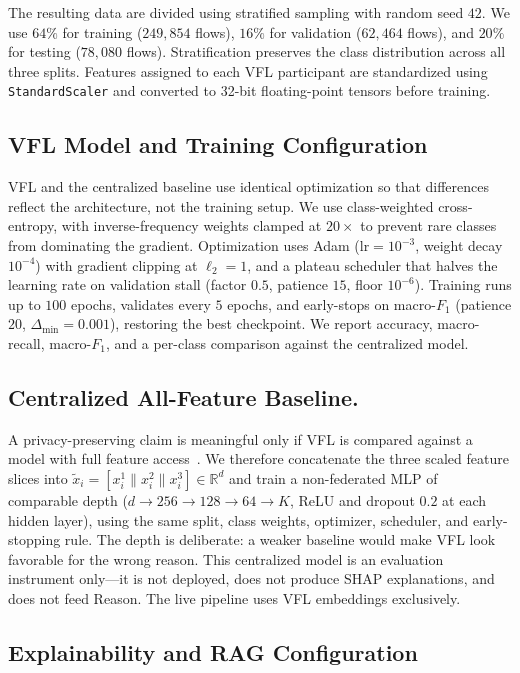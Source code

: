 \documentclass[10pt, conference]{IEEEtran}
\begin{document}
The resulting data are divided using stratified sampling with random seed $42$. We use $64\%$ for training ($249{,}854$ flows), $16\%$ for validation ($62{,}464$ flows), and $20\%$ for testing ($78{,}080$ flows). Stratification preserves the class distribution across all three splits. Features assigned to each VFL participant are standardized using \texttt{StandardScaler} and converted to 32-bit floating-point tensors before training.


\subsection{VFL Model and Training Configuration}
VFL and the centralized baseline use identical optimization so that differences reflect the architecture, not the training setup. We use class-weighted cross-entropy, with inverse-frequency weights clamped at $20\times$ to prevent rare classes from dominating the gradient. Optimization uses Adam ($\mathrm{lr}=10^{-3}$, weight decay $10^{-4}$) with gradient clipping at $\ell_2=1$, and a plateau scheduler that halves the learning rate on validation stall (factor $0.5$, patience $15$, floor $10^{-6}$). Training runs up to $100$ epochs, validates every $5$ epochs, and early-stops on macro-$F_1$ (patience $20$, $\Delta_{\min}=0.001$), restoring the best checkpoint. We report accuracy, macro-recall, macro-$F_1$, and a per-class comparison against the centralized model.

\subsection{Centralized All-Feature Baseline.}
A privacy-preserving claim is meaningful only if VFL is compared against a model with full feature access~\cite{ye2024vfl,yu2024vflprivacy}. We therefore concatenate the three scaled feature slices into $\tilde{x}_i = [x_i^1 \| x_i^2 \| x_i^3] \in \mathbb{R}^{d}$ and train a non-federated MLP of comparable depth ($d \to 256 \to 128 \to 64 \to K$, ReLU and dropout $0.2$ at each hidden layer), using the same split, class weights, optimizer, scheduler, and early-stopping rule. The depth is deliberate: a weaker baseline would make VFL look favorable for the wrong reason. This centralized model is an evaluation instrument only---it is not deployed, does not produce SHAP explanations, and does not feed Reason. The live pipeline uses VFL embeddings exclusively.

\subsection{Explainability and RAG Configuration}
\end{document}
